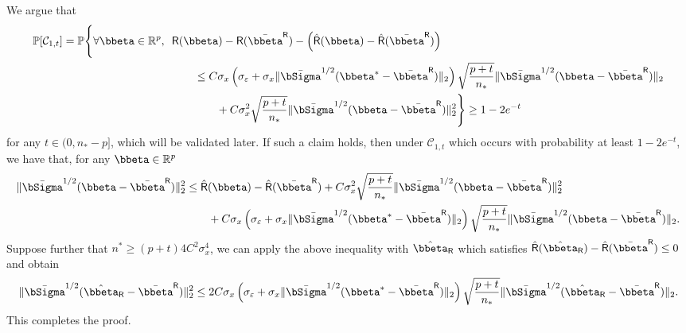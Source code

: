 \documentclass[10pt]{article}
\numberwithin{equation}{section}
\begin{document}
We argue that
\begin{align}
\label{eq:pooled-least-squares-high-prob-bound1}
\begin{split}
    \mathbb{P}[\mathcal{C}_{1,t}] = \mathbb{P} \Bigg\{ \forall \bbeta \in \mathbb{R}^p, ~~& \mathsf{R}(\bbeta) - \mathsf{R}(\bar{\bbeta}^{\mathsf{R}}) - \left(\hat{\mathsf{R}}(\bbeta) - \hat{\mathsf{R}}(\bar{\bbeta}^{\mathsf{R}}) \right) \\
    &~~~~~~ \le C \sigma_x \left(\sigma_\varepsilon + \sigma_x\|\bar{\bSigma}^{1/2}(\bbeta^* - \bar{\bbeta}^{\mathsf{R}})\|_2 \right) \sqrt{\frac{p+t}{n_*}} \|\bar{\bSigma}^{1/2}(\bbeta - \bar{\bbeta}^{\mathsf{R}})\|_2 \\
    &~~~~~~~~~~~~ + C \sigma_x^2 \sqrt{\frac{p + t}{n_*}} \|\bar{\bSigma}^{1/2}(\bbeta - \bar{\bbeta}^{\mathsf{R}})\|_2^2\Bigg\}\ge 1-2e^{-t}
\end{split}
\end{align} for any $t \in (0, n_* - p]$, which will be validated later. If such a claim holds, then under $\mathcal{C}_{1,t}$ which occurs with probability at least $1-2e^{-t}$, we have that, for any $\bbeta \in \mathbb{R}^p$
\begin{align*}
        \|\bar{\bSigma}^{1/2}(\bbeta - \bar{\bbeta}^{\mathsf{R}})\|_2^2 & \le \hat{\mathsf{R}}(\bbeta) - \hat{\mathsf{R}}(\bar{\bbeta}^{\mathsf{R}}) + C \sigma_x^2 \sqrt{\frac{p + t}{n_*}} \|\bar{\bSigma}^{1/2}(\bbeta - \bar{\bbeta}^{\mathsf{R}})\|_2^2 \\
        &~~~~~~ + C \sigma_x \left(\sigma_\varepsilon + \sigma_x\|\bar{\bSigma}^{1/2}(\bbeta^* - \bar{\bbeta}^{\mathsf{R}})\|_2 \right) \sqrt{\frac{p+t}{n_*}} \|\bar{\bSigma}^{1/2}(\bbeta - \bar{\bbeta}^{\mathsf{R}})\|_2.
\end{align*} Suppose further that $n^* \ge (p + t) 4C^2\sigma_x^4$, we can apply the above inequality with $\hat{\bbeta}_\mathsf{R}$ which satisfies $\hat{\mathsf{R}}(\hat{\bbeta}_\mathsf{R}) - \hat{\mathsf{R}}(\bar{\bbeta}^{\mathsf{R}})\le 0$ and obtain
\begin{align*}
\|\bar{\bSigma}^{1/2}(\hat{\bbeta}_\mathsf{R} - \bar{\bbeta}^{\mathsf{R}})\|_2^2 \le 2C \sigma_x \left(\sigma_\varepsilon + \sigma_x\|\bar{\bSigma}^{1/2}(\bbeta^* - \bar{\bbeta}^{\mathsf{R}})\|_2 \right) \sqrt{\frac{p+t}{n_*}} \|\bar{\bSigma}^{1/2}(\hat{\bbeta}_\mathsf{R} - \bar{\bbeta}^{\mathsf{R}})\|_2.
\end{align*} This completes the proof.
\end{document}
